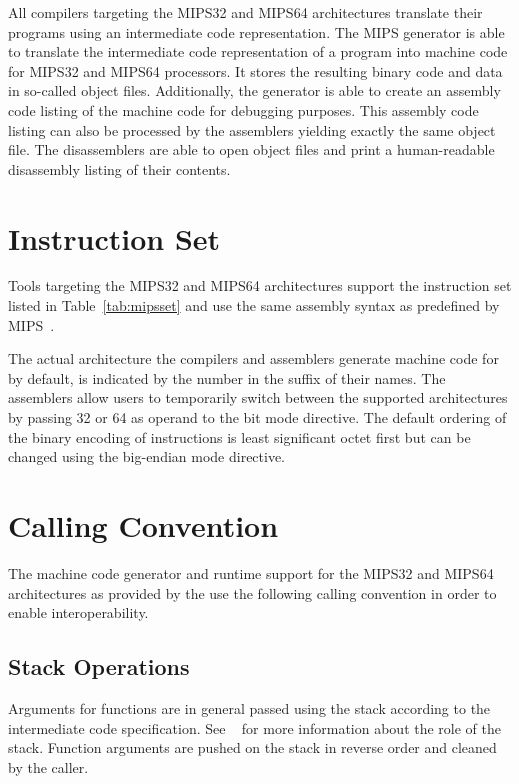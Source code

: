 All compilers targeting the MIPS32 and MIPS64 architectures translate their programs using an intermediate code representation.
The MIPS generator is able to translate the intermediate code representation of a program into machine code for MIPS32 and MIPS64 processors.
It stores the resulting binary code and data in so-called object files.
Additionally, the generator is able to create an assembly code listing of the machine code for debugging purposes.
This assembly code listing can also be processed by the assemblers yielding exactly the same object file.
The disassemblers are able to open object files and print a human-readable disassembly listing of their contents.
\seeobject\seecode

\section{Instruction Set}

Tools targeting the MIPS32 and MIPS64 architectures support the instruction set listed in Table~\ref{tab:mipsset} and use the same assembly syntax as predefined by MIPS~\cite{mips:volume1,mips:volume2}.
\seeassembly


The actual architecture the compilers and assemblers generate machine code for by default, is indicated by the number in the suffix of their names.
The assemblers allow users to temporarily switch between the supported architectures by passing 32 or 64 as operand to the bit mode directive.
The default ordering of the binary encoding of instructions is least significant octet first but can be changed using the big-endian mode directive.

\section{Calling Convention}

The machine code generator and runtime support for the MIPS32 and MIPS64 architectures as provided by the \ecs{} use the following calling convention in order to enable interoperability.

\subsection{Stack Operations}

Arguments for functions are in general passed using the stack according to the intermediate code specification.
See \Documentation{}~ for more information about the role of the stack.
Function arguments are pushed on the stack in reverse order and cleaned by the caller.

